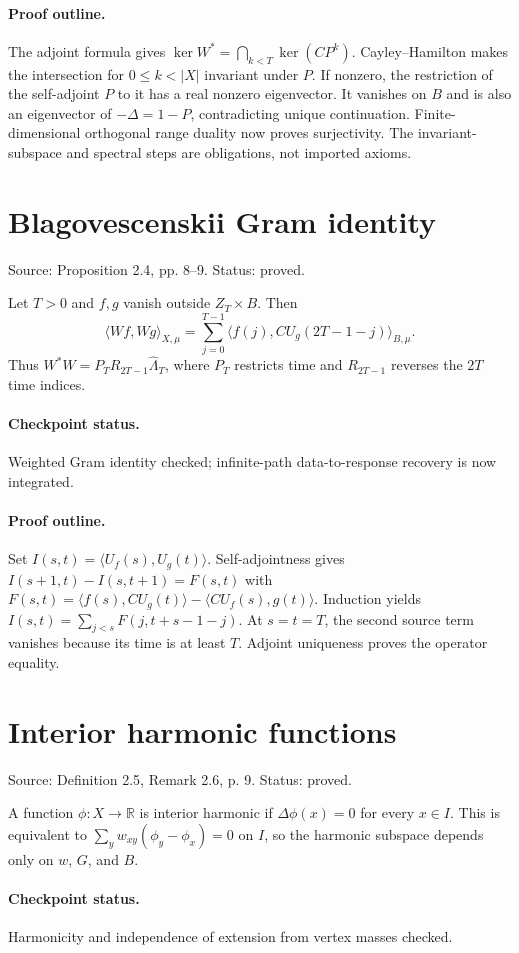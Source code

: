 \paragraph{Proof outline.}

The adjoint formula gives $\ker W^*=\bigcap_{k<T}\ker(CP^k)$. Cayley--Hamilton makes the intersection for $0\leq k<|X|$ invariant under $P$. If nonzero, the restriction of the self-adjoint $P$ to it has a real nonzero eigenvector. It vanishes on $B$ and is also an eigenvector of $-\Delta=1-P$, contradicting unique continuation. Finite-dimensional orthogonal range duality now proves surjectivity. The invariant-subspace and spectral steps are obligations, not imported axioms.
\nodebreak
\section{Blagovescenskii Gram identity}
Source: Proposition 2.4, pp. 8–9. Status: proved.
\begin{proposition}\label{gram-identity}

Let $T>0$ and $f,g$ vanish outside $Z_T\times B$. Then \[\langle Wf,Wg\rangle_{X,\mu}=\sum_{j=0}^{T-1}\langle f(j),CU_g(2T-1-j)\rangle_{B,\mu}.\] Thus $W^*W=P_TR_{2T-1}\widehat\Lambda_T$, where $P_T$ restricts time and $R_{2T-1}$ reverses the $2T$ time indices.


\paragraph{Checkpoint status.}
Weighted Gram identity checked; infinite-path data-to-response recovery is now integrated.
\end{proposition}
\paragraph{Proof outline.}

Set $I(s,t)=\langle U_f(s),U_g(t)\rangle$. Self-adjointness gives $I(s+1,t)-I(s,t+1)=F(s,t)$ with $F(s,t)=\langle f(s),CU_g(t)\rangle-\langle CU_f(s),g(t)\rangle$. Induction yields $I(s,t)=\sum_{j<s}F(j,t+s-1-j)$. At $s=t=T$, the second source term vanishes because its time is at least $T$. Adjoint uniqueness proves the operator equality.
\nodebreak
\section{Interior harmonic functions}
Source: Definition 2.5, Remark 2.6, p. 9. Status: proved.
\begin{definition}\label{harmonic}

A function $\phi:X\to\mathbb R$ is interior harmonic if $\Delta\phi(x)=0$ for every $x\in I$. This is equivalent to $\sum_yw_{xy}(\phi_y-\phi_x)=0$ on $I$, so the harmonic subspace depends only on $w$, $G$, and $B$.


\paragraph{Checkpoint status.}
Harmonicity and independence of extension from vertex masses checked.
\end{definition}
